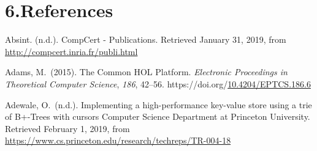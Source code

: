\documentclass[12pt,twoside]{article}
\begin{document}
\section{6.\hspace*{0.5em}References}\label{sec-references}%

{\mdsupressbiblabel{}\begin{thebibliography}{222}%
\label{sec-bibliography}%

\mdbibitemlabel{[Absint, n.d.]}Absint. (n.d.). CompCert - Publications. Retrieved January 31, 2019, from \href{http://compcert.inria.fr/publi.html}{{\ttfamily http://\hspace{0pt}compcert.\hspace{0pt}inria.\hspace{0pt}fr/\hspace{0pt}publi.\hspace{0pt}html}}\label{absint_compcert_nodate}%

\mdbibitemlabel{[Adams, 2015]}Adams, M.~(2015). The Common HOL Platform. \emph{Electronic Proceedings in Theoretical Computer Science}, \emph{186}, 42–56. https://doi.org/\href{https://dx.doi.org/10.4204/EPTCS.186.6}{10.4204/EPTCS.186.6}\label{adams_common_2015}%

\mdbibitemlabel{[Adewale, n.d.]}Adewale, O.~(n.d.). Implementing a high-performance key-value store using a trie of B+-Trees with cursors \textbar{} Computer Science Department at Princeton University. Retrieved February 1, 2019, from \href{https://www.cs.princeton.edu/research/techreps/TR-004-18}{{\ttfamily https://\hspace{0pt}www.\hspace{0pt}cs.\hspace{0pt}princeton.\hspace{0pt}edu/\hspace{0pt}research/\hspace{0pt}techreps/\hspace{0pt}TR-\hspace{0pt}004-\hspace{0pt}18}}\label{adewale_implementing_nodate}%


\end{thebibliography}}
\end{document}
